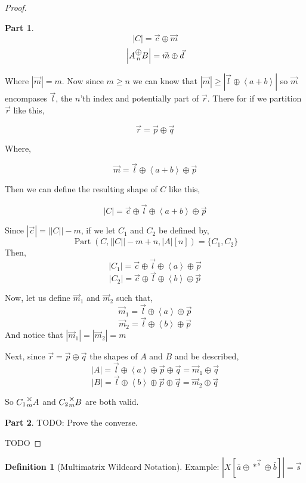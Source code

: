 \documentclass[12pt]{book}
\theoremstyle{plain}
\theoremstyle{definition}
\newtheorem{definition}{Definition}[chapter]
\theoremstyle{ppart}
\newtheorem{ppart}{Part}
\theoremstyle{case}
\theoremstyle{solution}
\DeclareMathOperator{\Part}{Part}
\newcommand{\mmult}[1]{\text{\raisebox{1ex}{$\underset{#1}{\times}$}}}
\newcommand{\mconcat}[1]{\text{\raisebox{1ex}{$\underset{#1}{\oplus}$}}}
\newcommand{\shape}[1]{\left|#1\right|}
\begin{document}
\begin{proof}
\begin{ppart}
\[ \shape{C} = \vec{c} \oplus \vec{m} \]
\[ \shape{A \mconcat{n} B} = \vec{m} \oplus \vec{d} \]

Where $\shape{\vec{m}} = m$. Now since $m \ge n$ we can know that
$\shape{\vec{m}} \ge \shape{\vec{l} \oplus \left<a+b\right>}$ 
so $\vec{m}$ encompases $\vec{l}$, the $n$'th index and potentially part of $\vec{r}$.
There for if we partition $\vec{r}$ like this,

\[ \vec{r} = \vec{p} \oplus \vec{q} \]

Where,

\[ \vec{m} = \vec{l} \oplus \left<a+b\right> \oplus \vec{p} \]

Then we can define the resulting shape of $C$ like this,

\[ \shape{C} = \vec{c} \oplus \vec{l} \oplus \left<a+b\right> \oplus \vec{p} \]

Since $\shape{\vec{c}} = \shape{\shape{C}}-m$, if we let $C_1$ and $C_2$ be defined by,
\[ \Part(C, \shape{\shape{C}}-m+n, \shape{A}[n]) = \{C_1, C_2\} \]
Then,
\[ \shape{C_1} = \vec{c} \oplus \vec{l} \oplus \left<a\right> \oplus \vec{p} \]
\[ \shape{C_2} = \vec{c} \oplus \vec{l} \oplus \left<b\right> \oplus \vec{p} \]

Now, let us define $\vec{m}_1$ and $\vec{m}_2$ such that,
\[ \vec{m}_1 = \vec{l} \oplus \left<a\right> \oplus \vec{p} \]
\[ \vec{m}_2 = \vec{l} \oplus \left<b\right> \oplus \vec{p} \]
And notice that $\shape{\vec{m}_1} = \shape{\vec{m}_2} = m$

Next, since $\vec{r} = \vec{p} \oplus \vec{q}$ the shapes of $A$ and $B$ and be described,
\[ \shape{A} = \vec{l} \oplus \left<a\right> \oplus \vec{p} \oplus \vec{q} = \vec{m}_1 \oplus \vec{q} \]
\[ \shape{B} = \vec{l} \oplus \left<b\right> \oplus \vec{p} \oplus \vec{q} = \vec{m}_2 \oplus \vec{q} \]

So $C_1 \mmult{m} A$ and $C_2 \mmult{m} B$ are both valid.

\end{ppart}
\begin{ppart}
TODO: Prove the converse.
\end{ppart}

TODO
\end{proof}

\begin{definition}[Multimatrix Wildcard Notation]
Example:
$\shape{X[\bar{a} \oplus *^{\vec{s}} \oplus \bar{b}]} = \vec{s}$
\end{definition}
\end{document}
